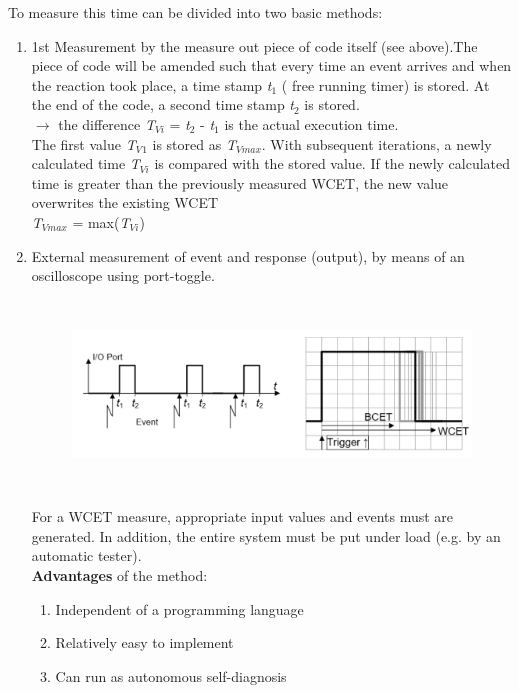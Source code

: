 To measure this time can be divided into two basic methods:

\begin{enumerate}
\item  1st Measurement by the measure out piece of code itself (see above).The piece of code will be amended such that every time an event arrives and when the reaction took place, a time stamp\textit{ t}${}_{1}$ ( free running timer) is stored. At the end of the code, a second time stamp\textit{ t}${}_{2}$ is stored.\\
$\rightarrow$ the difference \textit{T${}_{Vi}$} = \textit{t}${}_{2}$ - \textit{t}${}_{1}$ is the actual execution time.\\
	
The first value \textit{T${}_{V}$}${}_{1}$ is stored as \textit{T${}_{Vmax}$}. With subsequent iterations, a newly calculated time \textit{T${}_{Vi}$}  is compared with the stored value. If the newly calculated time is greater than the previously measured WCET, the new value overwrites the existing WCET\\
	
\textit{T${}_{Vmax}$} = max(\textit{T${}_{Vi}$})

\os{\newpage}

\item External measurement of event and response (output), by means of an oscilloscope using port-toggle.

	\begin{figure}[h]
    \centering
    \includegraphics[width=15cm, height=5cm]{Images/image77.png}
    \label{fig:Fig 23}
    \end{figure}
    
For a WCET measure, appropriate input values and events must are generated. In addition, the entire system must be put under load (e.g. by an automatic tester).\\

\textbf{Advantages} of the method:

\begin{enumerate}
	\item  Independent of a programming language
	\item  Relatively easy to implement
	\item  Can run as autonomous self-diagnosis
\end{enumerate}


\end{enumerate}
